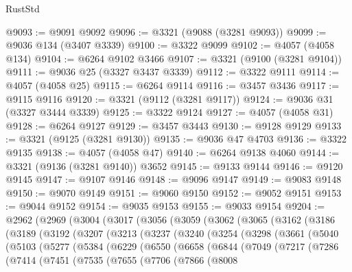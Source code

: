\begin{lexlean}{RustStd}
\begin{coremodule}
{\begin{coremodule}
{{{{{{{{{{{{{{{{{{{{{{{{{{{{{{{{{@9093 := @9091 @9092
@9096 := @3321 (@9088 (@3281 @9093))
@9099 := @9036 @134 (@3407 @3339)
@9100 := @3322 @9099
@9102 := @4057 (@4058 @134)
@9104 := @6264 @9102 @3466
@9107 := @3321 (@9100 (@3281 @9104))
@9111 := @9036 @25 (@3327 @3437 @3339)
@9112 := @3322 @9111
@9114 := @4057 (@4058 @25)
@9115 := @6264 @9114
@9116 := @3457 @3436
@9117 := @9115 @9116
@9120 := @3321 (@9112 (@3281 @9117))
@9124 := @9036 @31 (@3327 @3444 @3339)
@9125 := @3322 @9124
@9127 := @4057 (@4058 @31)
@9128 := @6264 @9127
@9129 := @3457 @3443
@9130 := @9128 @9129
@9133 := @3321 (@9125 (@3281 @9130))
@9135 := @9036 @47 @4703
@9136 := @3322 @9135
@9138 := @4057 (@4058 @47)
@9140 := @6264 @9138 @4060
@9144 := @3321 (@9136 (@3281 @9140)) @3652
@9145 := @9133 @9144
@9146 := @9120 @9145
@9147 := @9107 @9146
@9148 := @9096 @9147
@9149 := @9083 @9148
@9150 := @9070 @9149
@9151 := @9060 @9150
@9152 := @9052 @9151
@9153 := @9044 @9152
@9154 := @9035 @9153
@9155 := @9033 @9154
@9204 := @2962
    (@2969
      (@3004
        (@3017
          (@3056
            (@3059
              (@3062
                (@3065
                  (@3162
                    (@3186
                      (@3189
                        (@3192
                          (@3207
                            (@3213
                              (@3237
                                (@3240
                                  (@3254
                                    (@3298
                                      (@3661
                                        (@5040
                                          (@5103
                                            (@5277
                                              (@5384
                                                (@6229
                                                  (@6550
                                                    (@6658
                                                      (@6844
                                                        (@7049
                                                          (@7217
                                                            (@7286
                                                              (@7414
                                                                (@7451
                                                                  (@7535
                                                                    (@7655
                                                                      (@7706
                                                                        (@7866
                                                                          (@8008
}}}}}}}}}}}}}}}}}}}}}}}}}}}}}}}}}
\end{coremodule}}
\end{coremodule}
\end{lexlean}
